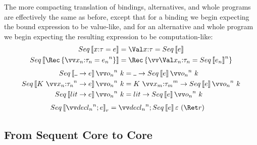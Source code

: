 \documentclass{article}
\begin{document}
The more compacting translation of bindings, alternatives, and whole programs
are effectively the same as before, except that for a binding we begin expecting
the bound expression to be value-like, and for an alternative and whole program
we begin expecting the resulting expression to be computation-like:
\begin{align*}
  Seq\trans{\nonrec{\ann x \ty = \expr}}
  &=
  \nonrec{\bindv{\ann x \ty}{Seq\trans{\expr}}}
  \\
  Seq\trans{\rec{\vect[n]{\ann{x_n}{\ty_n} = \expr_n}}}
  &=
  \rec{\vect[n]{\bindv{\ann{x_n}{\ty_n}}{Seq\trans{\expr_n}}}}
\end{align*}
\begin{align*}
  Seq\trans{\blank \to \expr} \vect[n]{\frm_n} ~ \ko
  &=
  \blank \to Seq\trans{\expr} \vect[n]{\frm_n} ~ \ko
  \\
  Seq\trans{K ~ \vect[n]{\ann{x_n}{\ty_n}} \to \expr} \vect[n]{\frm_n} ~ \ko
  &=
  K ~ \vect[m]{\ann{x_m}{\ty_m}}
  \to
  Seq\trans{\expr} \vect[n]{\frm_n} ~ \ko
  \\
  Seq\trans{\lit \to \expr} \vect[n]{\frm_n} ~ \ko
  &=
  \lit \to Seq\trans{\expr} \vect[n]{\frm_n} ~ \ko
\end{align*}
\begin{align*}
  Seq\trans{\vect[n]{\decl_n}; \expr}_{r}
  &=
  \vect[n]{\decl_n}; Seq\trans{\expr} \mt ~ (\ret r)
\end{align*}

\subsection{From Sequent Core to Core}
\end{document}
